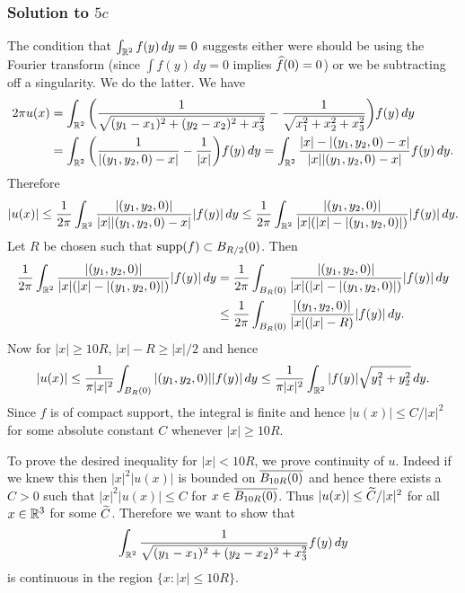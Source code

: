 \subsubsection*{Solution to $5c$}
The condition that $\int_{\mathbb{R}^{2}}f(y)\, dy = 0$ suggests either were should be using the Fourier transform (since $\int f(y)\, dy = 0$ implies $\widehat{f}(0) = 0$) or we be subtracting off a singularity. We do the latter.
We have
\begin{align*}
2\pi u(x) &= \int_{\mathbb{R}^{2}}\bigg(\frac{1}{\sqrt{(y_{1} - x_{1})^{2} + (y_{2} - x_{2})^{2} + x_{3}^{2}}} - \frac{1}{\sqrt{x_{1}^{2} + x_{2}^{2} + x_{3}^{2}}}\bigg)f(y)\, dy\\
&= \int_{\mathbb{R}^{2}}\bigg(\frac{1}{|(y_{1}, y_{2}, 0) - x|} - \frac{1}{|x|}\bigg)f(y)\, dy= \int_{\mathbb{R}^{2}}\frac{|x| - |(y_{1}, y_{2}, 0) - x|}{|x||(y_{1}, y_{2}, 0) - x|}f(y)\, dy.
\end{align*}
Therefore
\begin{align*}
|u(x)| \leq \frac{1}{2\pi}\int_{\mathbb{R}^{2}}\frac{|(y_{1}, y_{2}, 0)|}{|x||(y_{1}, y_{2}, 0) - x|}|f(y)|\, dy \leq \frac{1}{2\pi}\int_{\mathbb{R}^{2}}\frac{|(y_{1}, y_{2}, 0)|}{|x|(|x| - |(y_{1}, y_{2}, 0)|)}|f(y)|\, dy.
\end{align*}
Let $R$ be chosen such that $\operatorname{supp}(f) \subset B_{R/2}(0)$. Then
\begin{align*}
\frac{1}{2\pi}\int_{\mathbb{R}^{2}}\frac{|(y_{1}, y_{2}, 0)|}{|x|(|x| - |(y_{1}, y_{2}, 0)|)}|f(y)|\, dy &= \frac{1}{2\pi}\int_{B_{R}(0)}\frac{|(y_{1}, y_{2}, 0)|}{|x|(|x| - |(y_{1}, y_{2}, 0)|)}|f(y)|\, dy\\
&\leq \frac{1}{2\pi}\int_{B_{R}(0)}\frac{|(y_{1}, y_{2}, 0)|}{|x|(|x| - R)}|f(y)|\, dy.
\end{align*}
Now for $|x| \geq 10R$, $|x| - R \geq |x|/2$ and hence
\begin{align*}
|u(x)| \leq \frac{1}{\pi |x|^{2}}\int_{B_{R}(0)}|(y_{1}, y_{2}, 0)||f(y)|\, dy \leq \frac{1}{\pi|x|^{2}}\int_{\mathbb{R}^{2}}|f(y)|\sqrt{y_{1}^{2} + y_{2}^{2}}\, dy.
\end{align*}
Since $f$ is of compact support, the integral is finite and hence $|u(x)| \leq C/|x|^{2}$ for some absolute constant $C$ whenever $|x| \geq 10R$.

To prove the desired inequality for $|x| < 10R$, we prove continuity of $u$. Indeed if we knew this then $|x|^{2}|u(x)|$ is bounded on $\overline{B_{10R}(0)}$ and hence
there exists a $C > 0$ such that $|x|^{2}|u(x)| \leq C$ for $x \in \overline{B_{10R}(0)}$. Thus $|u(x)| \leq \widetilde{C}/|x|^{2}$ for all $x \in \mathbb{R}^{3}$ for some $\widetilde{C}$.
Therefore we want to show that $$\int_{\mathbb{R}^{2}}\frac{1}{\sqrt{(y_{1} - x_{1})^{2} + (y_{2} - x_{2})^{2} + x_{3}^{2}}}f(y)\, dy$$ is continuous in the region
$\{x: |x| \leq 10R\}$.

